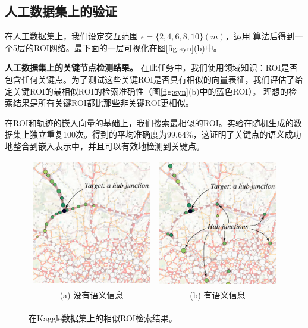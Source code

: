 \subsection{人工数据集上的验证}
在人工数据集上，我们设定交互范围 $\epsilon = \{2,4,6,8,10\}(m)$，运用\CascadeSync
算法后得到一个5层的ROI网络。最下面的一层可视化在图\ref{fig:syn}(b)中。


\vspace{1.5mm}
\textbf{人工数据集上的关键节点检测结果。} 
在此任务中，我们使用领域知识：ROI是否包含任何关键点。为了测试这些关键ROI是否具有相似的向量表征，我们评估了给定关键ROI的最相似ROI的检索准确性（图\ref{fig:syn}(b)中的蓝色ROI）。 理想的检索结果是所有关键ROI都比那些非关键ROI更相似。

在ROI和轨迹的嵌入向量的基础上，我们搜索最相似的ROI。实验在随机生成的数据集上独立重复100次。得到的平均准确度为$\boldsymbol{99.64\%}$，这证明了关键点的语义成功地整合到嵌入表示中，并且可以有效地检测到关键点。



\tabcolsep=2pt
\begin{figure}[!t]
\centering
\begin{tabular}{cc}
\includegraphics[width=65mm]{pics/SP3.pdf}&
\includegraphics[width=65mm]{pics/SP4.pdf}\\
(a) 没有语义信息 & (b) 有语义信息
\end{tabular}
\caption{在Kaggle数据集上的相似ROI检索结果。}
\label{fig:regionSim}
\end{figure}

